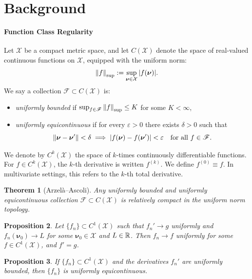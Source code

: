 \documentclass{article} %
\newtheorem{theorem}{Theorem}
\newtheorem{proposition}[theorem]{Proposition}
\newcommand{\bhp}{\bm{\nu}}                       %
\newcommand{\searchspace}{\mathcal{X}}            %
\newcommand{\family}{\mathscr{F}}
\newcommand{\supnorm}[1]{\norm{#1}_{\mathrm{sup}}}
\begin{document}
\section{Background}\label{app:background}

\paragraph{Function Class Regularity} 
Let \( \searchspace \) be a compact metric space, and let \( C(\searchspace) \) denote the space of real-valued continuous functions on \( \searchspace \), equipped with the uniform norm:
\[
    \supnorm{f} := \sup_{\bhp \in \searchspace} |f(\bhp)|.
\]
We say a collection \( \family \subset C(\searchspace) \) is:
\begin{itemize}
    \item \emph{uniformly bounded} if \( \sup_{f \in \family} \supnorm{f} \leq K \) for some \( K < \infty \),
    \item \emph{uniformly equicontinuous} if for every \( \varepsilon > 0 \) there exists \( \delta > 0 \) such that
    \[
        \norm{\bhp - \bhp'} < \delta \implies |f(\bhp) - f(\bhp')| < \varepsilon \quad \text{for all } f \in \family.
    \]
\end{itemize}

We denote by \( C^k(\searchspace) \) the space of \( k \)-times continuously differentiable functions. For \( f \in C^k(\searchspace) \), the \( k \)-th derivative is written \( f^{(k)} \). We define $f^{(0)} \equiv f$. In multivariate settings, this refers to the \( k \)-th total derivative.

\begin{theorem}[Arzelà--Ascoli]\label{thm:arzela-ascoli}
Any uniformly bounded and uniformly equicontinuous collection \( \family \subset C(\searchspace) \) is relatively compact in the uniform norm topology.
\end{theorem}

\begin{proposition}\label{prop:derivative_uniform_convergence}
Let \( \{f_n\} \subset C^1(\searchspace) \) such that \( f_n' \to g \) uniformly and \( f_n(\bhp_0) \to L \) for some \( \bhp_0 \in \searchspace \) and $L \in \mathbb{R}$. Then \( f_n \to f \) uniformly for some \( f \in C^1(\searchspace) \), and \( f' = g \).
\end{proposition}

\begin{proposition}\label{prop:equi_deriv_bound}
If \( \{f_n\} \subset C^1(\searchspace) \) and the derivatives \( f_n' \) are uniformly bounded, then \( \{f_n\} \) is uniformly equicontinuous.
\end{proposition}
\end{document}
